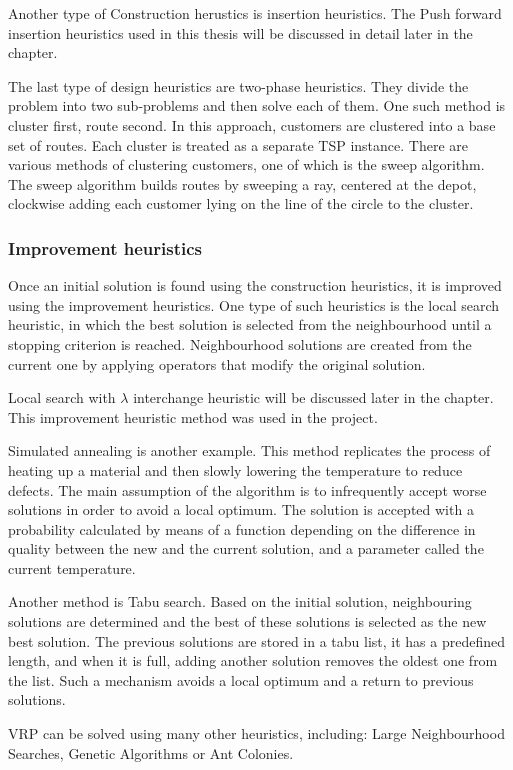 \documentclass[a4paper,twoside,12pt]{book}
\begin{document}
Another type of Construction herustics is insertion heuristics. The Push forward insertion heuristics used in this thesis will be discussed in detail later in the chapter.

The last type of design heuristics are two-phase heuristics. They divide the problem into two sub-problems and then solve each of them. One such method is cluster first, route second. In this approach, customers are clustered into a base set of routes. Each cluster is treated as a separate TSP instance. There are various methods of clustering customers, one of which is the sweep algorithm. The sweep algorithm builds routes by sweeping a ray, centered at the depot, clockwise adding each customer lying on the line of the circle to the cluster.
\subsubsection{Improvement heuristics}
Once an initial solution is found using the construction heuristics, it is improved using the improvement heuristics. One type of such heuristics is the local search heuristic, in which the best solution is selected from the neighbourhood until a stopping criterion is reached. Neighbourhood solutions are created from the current one by applying operators that modify the original solution. 

Local search with $\lambda$ interchange heuristic will be discussed later in the chapter. This improvement heuristic method was used in the project.

Simulated annealing is another example. This method replicates the process of heating up a material and then slowly lowering the temperature to reduce defects. The main assumption of the algorithm is to infrequently accept worse solutions in order to avoid a local optimum. The solution is accepted with a probability calculated by means of a function depending on the difference in quality between the new and the current solution, and a parameter called the current temperature.

Another method is Tabu search. Based on the initial solution, neighbouring solutions are determined and the best of these solutions is selected as the new best solution. The previous solutions are stored in a tabu list, it has a predefined length, and when it is full, adding another solution removes the oldest one from the list. Such a mechanism avoids a local optimum and a return to previous solutions. 

VRP can be solved using many other heuristics, including: Large Neighbourhood Searches, Genetic Algorithms or Ant Colonies.
\end{document}
